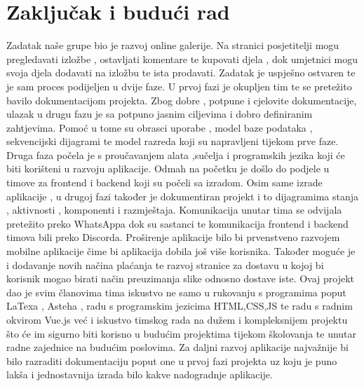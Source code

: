 \chapter{Zaključak i budući rad}
		

		{Zadatak naše grupe bio je razvoj online galerije. Na stranici posjetitelji mogu pregledavati izložbe , ostavljati komentare te kupovati djela , dok umjetnici mogu svoja djela dodavati na izložbu te ista prodavati. Zadatak je uspješno ostvaren te je sam proces podijeljen u dvije faze. 
		U prvoj fazi je okupljen tim te se pretežito bavilo dokumentacijom projekta. Zbog dobre , potpune i cjelovite dokumentacije, ulazak u drugu fazu je sa potpuno jasnim ciljevima i dobro definiranim zahtjevima. Pomoć u tome su  obrasci uporabe , model baze podataka , sekvencijski dijagrami te
		model razreda koji su napravljeni tijekom prve faze. Druga faza počela je s proučavanjem alata ,sučelja i programskih jezika koji će biti korišteni u razvoju aplikacije. Odmah na početku je došlo do podjele u timove za frontend i backend  koji su počeli sa izradom. Osim same izrade aplikacije , u drugoj fazi 
		također je  dokumentiran projekt i to dijagramima stanja , aktivnosti , komponenti i razmještaja. Komunikacija unutar tima se odvijala pretežito preko WhatsAppa dok su sastanci te komunikacija frontend i backend timova bili preko Discorda. 
		Proširenje aplikacije bilo bi prvenstveno razvojem mobilne aplikacije čime bi aplikacija dobila još više korisnika. Također moguće je i dodavanje novih načina plaćanja te razvoj stranice za dostavu u kojoj bi korisnik mogao birati način preuzimanja slike odnosno dostave iste.
		 Ovaj projekt dao je svim članovima tima iskustvo ne samo u rukovanju s programima poput LaTexa  , Asteha , radu s programskim jezicima HTML,CSS,JS te radu s radnim okvirom Vue.js
		već i iskustvo timskog rada na dužem i kompleksnijem projektu što će im sigurno biti korisno u budućim projektima tijekom školovanja te unutar radne zajednice na budućim poslovima.
		Za daljni razvoj aplikacije najvažnije bi bilo razraditi dokumentaciju poput one u prvoj fazi projekta uz koju je puno lakša i jednostavnija izrada bilo kakve nadogradnje aplikacije.
		 }
		
		\eject 